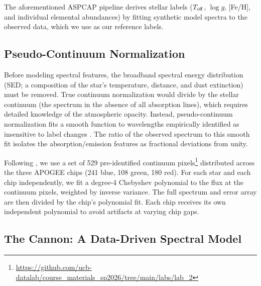 \documentclass[10pt,preprint2]{aastex}
\begin{document}
The aforementioned ASPCAP pipeline \citep{GarciaPerez2016} derives stellar labels ($T_{\rm eff}$, $\log g$, [Fe/H], and individual elemental abundances) by fitting synthetic model spectra to the observed data, which we use as our reference labels.

\subsection{Pseudo-Continuum Normalization}

Before modeling spectral features, the broadband spectral energy distribution (SED; a composition of the star's temperature, distance, and dust extinction) must be removed. True continuum normalization would divide by the stellar continuum (the spectrum in the absence of all absorption lines), which requires detailed knowledge of the atmospheric opacity. Instead, pseudo-continuum normalization fits a smooth function to wavelengths empirically identified as insensitive to label changes \citep{Ness2015}. The ratio of the observed spectrum to this smooth fit isolates the absorption/emission features as fractional deviations from unity.

Following \citet{Ness2015}, we use a set of 529 pre-identified continuum pixels\footnote{\url{https://github.com/ucb-datalab/course_materials_sp2026/tree/main/labs/lab_2}} distributed across the three APOGEE chips (241 blue, 108 green, 180 red). For each star and each chip independently, we fit a degree-4 Chebyshev polynomial to the flux at the continuum pixels, weighted by inverse variance. The full spectrum and error array are then divided by the chip's polynomial fit. Each chip receives its own independent polynomial to avoid artifacts at varying chip gaps.

\subsection{The Cannon: A Data-Driven Spectral Model}
\label{sec:cannon_theory}
\end{document}
